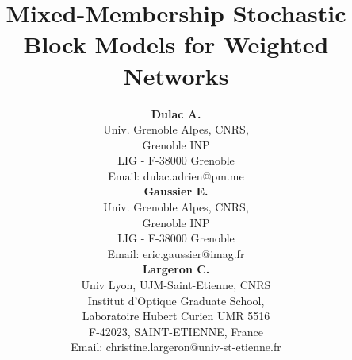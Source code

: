 \documentclass[letterpaper]{article}
\begin{document}
\title{Mixed-Membership Stochastic Block Models for Weighted Networks}


\author{{\bf Dulac A.}\\
Univ. Grenoble Alpes, CNRS,\\
Grenoble INP\\
LIG - F-38000 Grenoble\\
Email: dulac.adrien@pm.me\\
\And
{\bf Gaussier E.}\\
Univ. Grenoble Alpes, CNRS,\\
 Grenoble INP\\
LIG - F-38000 Grenoble\\
Email:  eric.gaussier@imag.fr\\
\And
{\bf Largeron C.}\\
Univ Lyon, UJM-Saint-Etienne, CNRS\\
Institut d'Optique Graduate School,\\
Laboratoire Hubert Curien UMR 5516\\
F-42023, SAINT-ETIENNE, France\\ 
Email: christine.largeron@univ-st-etienne.fr\\
}	


\maketitle
\end{document}

